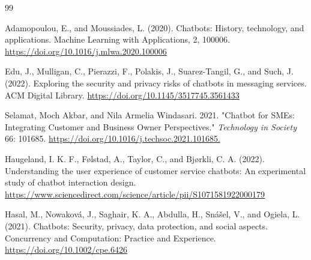 \documentclass[a4paper]{article}
\begin{document}
\begin{thebibliography}{99}

Adamopoulou, E., and Moussiades, L. (2020). Chatbots: History, technology, and applications. Machine Learning with Applications, 2, 100006. \url{https://doi.org/10.1016/j.mlwa.2020.100006}

Edu, J., Mulligan, C., Pierazzi, F., Polakis, J., Suarez-Tangil, G., and Such, J. (2022). Exploring the security and privacy risks of chatbots in messaging services. ACM Digital Library. \url{https://doi.org/10.1145/3517745.3561433}


Selamat, Moch Akbar, and Nila Armelia Windasari. 2021. "Chatbot for SMEs: Integrating Customer and Business Owner Perspectives." \textit{Technology in Society} 66: 101685. \url{https://doi.org/10.1016/j.techsoc.2021.101685.}

Haugeland, I. K. F., Følstad, A., Taylor, C., and Bjørkli, C. A. (2022). Understanding the user experience of customer service chatbots: An experimental study of chatbot interaction design. \url{https://www.sciencedirect.com/science/article/pii/S1071581922000179}

Hasal, M., Nowaková, J., Saghair, K. A., Abdulla, H., Snášel, V., and Ogiela, L. (2021). Chatbots: Security, privacy, data protection, and social aspects. Concurrency and Computation: Practice and Experience. \url{https://doi.org/10.1002/cpe.6426}



\end{thebibliography}
\end{document}

